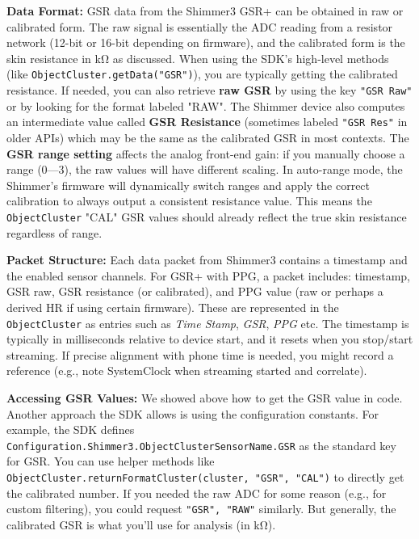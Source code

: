 {{\textbf{Data Format:} GSR data from the Shimmer3 GSR+ can be obtained in raw
or calibrated form. The raw signal is essentially the ADC reading from a
resistor network (12-bit or 16-bit depending on firmware), and the
calibrated form is the skin resistance in kΩ as discussed. When using
the SDK's high-level methods (like \texttt{ObjectCluster.getData("GSR")}), you
are typically getting the calibrated resistance. If needed, you can also
retrieve \textbf{raw GSR} by using the key \texttt{"GSR Raw"} or by looking for the
format labeled "RAW". The Shimmer device also computes an intermediate
value called \textbf{GSR Resistance} (sometimes labeled \texttt{"GSR Res"} in older
APIs) which may be the same as the calibrated GSR in most contexts. The
\textbf{GSR range setting} affects the analog front-end gain: if you manually
choose a range (0---3), the raw values will have different scaling. In
auto-range mode, the Shimmer's firmware will dynamically switch ranges
and apply the correct calibration to always output a consistent
resistance
value\cite{ref21}.
This means the \texttt{ObjectCluster} "CAL" GSR values should already reflect
the true skin resistance regardless of range.

\textbf{Packet Structure:} Each data packet from Shimmer3 contains a
timestamp and the enabled sensor channels. For GSR+ with PPG, a packet
includes: timestamp, GSR raw, GSR resistance (or calibrated), and PPG
value (raw or perhaps a derived HR if using certain firmware). These are
represented in the \texttt{ObjectCluster} as entries such as \textit{Time Stamp},
\textit{GSR}, \textit{PPG} etc. The timestamp is typically in milliseconds relative to
device start, and it resets when you stop/start streaming. If precise
alignment with phone time is needed, you might record a reference (e.g.,
note SystemClock when streaming started and correlate).

\textbf{Accessing GSR Values:} We showed above how to get the GSR value in
code. Another approach the SDK allows is using the configuration
constants. For example, the SDK defines
\texttt{Configuration.Shimmer3.ObjectClusterSensorName.GSR} as the standard key
for
GSR\cite{ref28}.
You can use helper methods like
\texttt{ObjectCluster.returnFormatCluster(cluster, "GSR", "CAL")} to directly
get the calibrated number. If you needed the raw ADC for some reason
(e.g., for custom filtering), you could request \texttt{"GSR", "RAW"}
similarly. But generally, the calibrated GSR is what you'll use for
analysis (in kΩ).

}}
